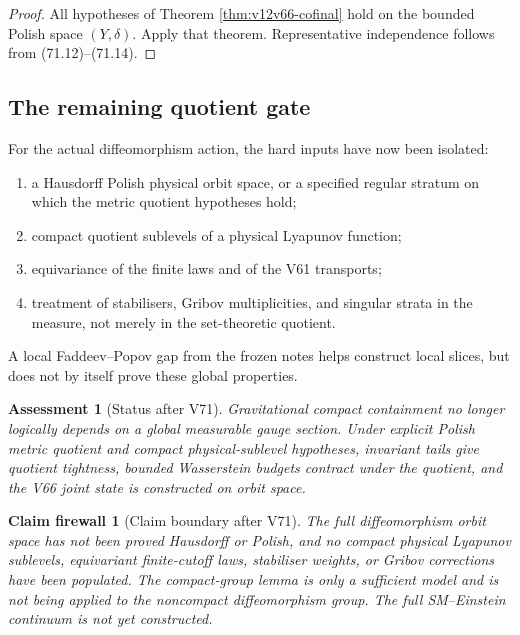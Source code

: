 \documentclass[11pt]{article}
\newtheorem{firewall}[theorem]{Claim firewall}
\newtheorem{assessment}[theorem]{Assessment}
\theoremstyle{remark}
\begin{document}
\begin{proof}
All hypotheses of Theorem \ref{thm:v12v66-cofinal} hold on the
bounded Polish space \((Y,\delta)\).  Apply that theorem.
Representative independence follows from (71.12)--(71.14).
\end{proof}

\subsection{The remaining quotient gate}

For the actual diffeomorphism action, the hard inputs have now been
isolated:
\begin{enumerate}
\item a Hausdorff Polish physical orbit space, or a specified regular
      stratum on which the metric quotient hypotheses hold;
\item compact quotient sublevels of a physical Lyapunov function;
\item equivariance of the finite laws and of the V61 transports;
\item treatment of stabilisers, Gribov multiplicities, and singular
      strata in the measure, not merely in the set-theoretic quotient.
\end{enumerate}
A local Faddeev--Popov gap from the frozen notes helps construct local
slices, but does not by itself prove these global properties.

\begin{assessment}[Status after V71]
\label{ass:v12v71-status}
Gravitational compact containment no longer logically depends on a
global measurable gauge section.  Under explicit Polish metric
quotient and compact physical-sublevel hypotheses, invariant tails
give quotient tightness, bounded Wasserstein budgets contract under
the quotient, and the V66 joint state is constructed on orbit space.
\end{assessment}

\begin{firewall}[Claim boundary after V71]
\label{fire:v12v71-claim}
The full diffeomorphism orbit space has not been proved Hausdorff or
Polish, and no compact physical Lyapunov sublevels, equivariant
finite-cutoff laws, stabiliser weights, or Gribov corrections have
been populated.  The compact-group lemma is only a sufficient model
and is not being applied to the noncompact diffeomorphism group.
The full SM--Einstein continuum is not yet constructed.
\end{firewall}
\end{document}
